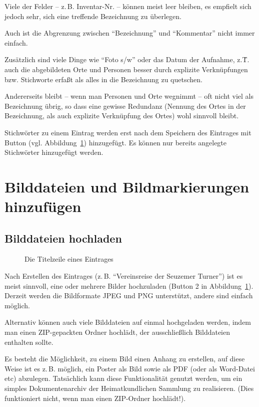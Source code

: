 \documentclass[12pt]{scrreprt}
\begin{document}
Viele der Felder -- z.\,B. Inventar-Nr. -- können meist leer bleiben,
es empfielt sich jedoch sehr, sich eine treffende Bezeichnung zu überlegen.

Auch ist die Abgrenzung zwischen ``Bezeichnung'' und ``Kommentar''
nicht immer einfach.

Zusätzlich sind viele Dinge wie ``Foto s/w'' oder das Datum der Aufnahme,
z.\.T. auch die abgebildeten Orte und Personen besser durch explizite
Verknüpfungen bzw. Stichworte erfaßt als alles in die Bezeichnung zu quetschen.

Andererseits bleibt -- wenn man Personen und Orte wegnimmt -- oft
nicht viel als Bezeichnung übrig, so dass eine gewisse Redundanz
(Nennung des Ortes in der Bezeichnung, als auch explizite Verknüpfung
des Ortes) wohl sinnvoll bleibt.

Stichwörter zu einem Eintrag werden erst nach dem Speichern des Eintrages
mit Button  (vgl. Abbildung~\ref{eintrag-menu}) hinzugefügt. Es können
nur bereits angelegte Stichwörter hinzugefügt werden. 

\section{Bilddateien und Bildmarkierungen hinzufügen}

\subsection{Bilddateien hochladen}

\begin{figure}
  \caption{\label{eintrag-menu} Die Titelzeile eines Eintrages}
\end{figure}

Nach Erstellen des Eintrages (z.\,B. ``Vereinsreise der Seuzemer
Turner'') ist es meist sinnvoll, eine oder mehrere Bilder
hochzuladen (Button {\color{red} 2} in Abbildung~\ref{eintrag-menu}).
Derzeit werden die Bildformate JPEG und PNG unterstützt,
andere sind einfach möglich.

Alternativ können auch viele Bilddateien auf einmal hochgeladen werden,
indem man einen  ZIP-gepackten Ordner hochlädt, der ausschließlich Bilddateien
enthalten sollte.

Es besteht die Möglichkeit, zu einem Bild einen Anhang zu erstellen,
auf diese Weise ist es z.\,B. möglich, ein Poster als Bild sowie als
PDF (oder als Word-Datei etc) abzulegen. Tatsächlich kann diese
Funktionalität genutzt werden, um ein simples Dokumentenarchiv der
Heimatkundlichen Sammlung zu realisieren. (Dies funktioniert nicht,
wenn man einen ZIP-Ordner hochlädt!).
\end{document}

